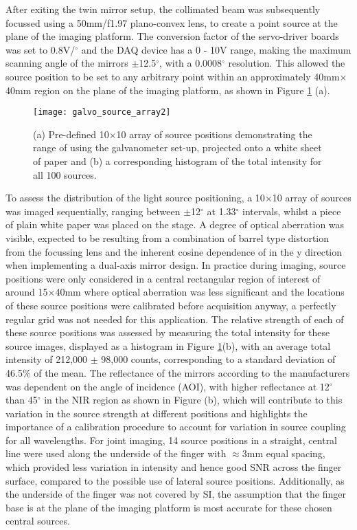 \documentclass[twoside]{bhamthesis}
\theoremstyle{definition}
\begin{document}
After exiting the twin mirror setup, the collimated beam was subsequently focussed using a 50mm/f1.97 plano-convex lens, to create a point source at the plane of the imaging platform. The conversion factor of the servo-driver boards was set to 0.8V/$^\circ$ and the DAQ device has a 0 - 10V range, making the maximum scanning angle of the mirrors $\pm$12.5$^\circ$, with a 0.0008$^\circ$ resolution. This allowed the source position to be set to any arbitrary point within an approximately 40mm$\times$40mm region on the plane of the imaging platform, as shown in Figure \ref{fig:Galvo_histogram} (a).

\begin{figure}[!ht]
\centering
  \texttt{[image: galvo\_source\_array2]} 
\caption{(a) Pre-defined 10$\times$10 array of source positions demonstrating the range of using the galvanometer set-up, projected onto a white sheet of paper and (b) a corresponding histogram of the total intensity for all 100 sources.}
\label{fig:Galvo_histogram}
\end{figure} 

To assess the distribution of the light source positioning, a 10$\times$10 array of sources was imaged sequentially, ranging between $\pm$12$^\circ$ at 1.33$^\circ$ intervals, whilst a piece of plain white paper was placed on the stage. A degree of optical aberration was visible, expected to be resulting from a combination of barrel type distortion from the focussing lens and the inherent cosine dependence of in the y direction when implementing a dual-axis mirror design. In practice during imaging, source positions were only considered in a central rectangular region of interest of around 15$\times$40mm where optical aberration was less significant and the locations of these source positions were calibrated before acquisition anyway, a perfectly regular grid was not needed for this application. The relative strength of each of these source positions was assessed by measuring the total intensity for these source images, displayed as a histogram in Figure \ref{fig:Galvo_histogram}(b), with an average total intensity of 212,000 $\pm$ 98,000 counts, corresponding to a standard deviation of 46.5\% of the mean. The reflectance of the mirrors according to the manufacturers was dependent on the angle of incidence (AOI), with higher reflectance at 12$^\circ$ than 45$^\circ$ in the NIR region as shown in Figure (b), which will contribute to this variation in the source strength at different positions and highlights the importance of a calibration procedure to account for variation in source coupling for all wavelengths. For joint imaging, 14 source positions in a straight, central line were used along the underside of the finger with $\approx$3mm equal spacing, which provided less variation in intensity and hence good SNR across the finger surface, compared to the possible use of lateral source positions. Additionally, as the underside of the finger was not covered by SI, the assumption that the finger base is at the plane of the imaging platform is most accurate for these chosen central sources.
\end{document}
